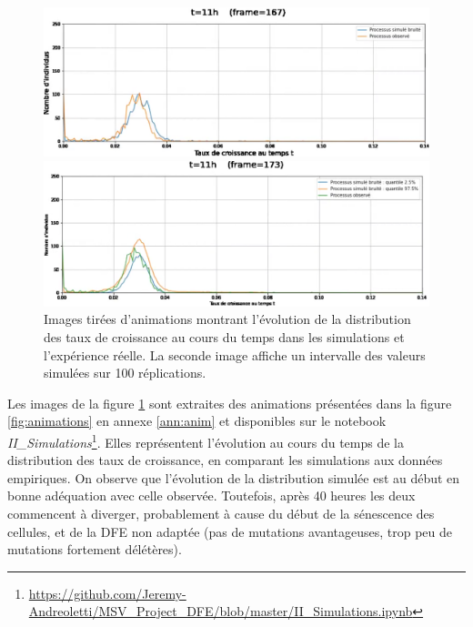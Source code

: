 \documentclass[12pt]{article}
\begin{document}
\begin{figure}[h]
  \begin{center}
    \vspace{3mm}
    \includegraphics[scale=0.25]{img/GrowthRates_noisySimulations_VS_observations.png}

    \vspace{5mm}

    \includegraphics[scale=0.25]{img/GrowthRates_noisySimulationsInterval_VS_observations.png}
  \end{center} 
  \caption{\label{fig:ss_animations}Images tirées d'animations montrant l'évolution de la distribution des taux de croissance au cours du temps dans les simulations et l'expérience réelle. La seconde image affiche un intervalle des valeurs simulées sur 100 réplications.}
\end{figure}

Les images de la figure \ref{fig:ss_animations} sont extraites des animations présentées dans la figure \ref{fig:animations} en annexe \ref{ann:anim} et disponibles sur le notebook \emph{II\_Simulations}\footnote{\url{https://github.com/Jeremy-Andreoletti/MSV_Project_DFE/blob/master/II_Simulations.ipynb}}. Elles représentent l'évolution au cours du temps de la distribution des taux de croissance, en comparant les simulations aux données empiriques. On observe que l'évolution de la distribution simulée est au début en bonne adéquation avec celle observée. Toutefois, après 40 heures les deux commencent à diverger, probablement à cause du début de la sénescence des cellules, et de la DFE non adaptée (pas de mutations avantageuses, trop peu de mutations fortement délétères).
\end{document}
